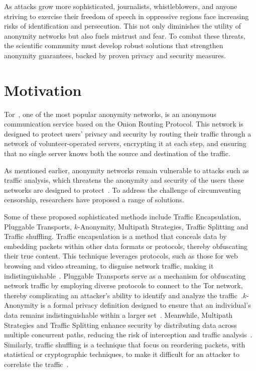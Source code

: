 As attacks grow more sophisticated, journalists, whistleblowers, and anyone striving to exercise their freedom of speech in oppressive regions face increasing risks of identification and persecution. This not only diminishes the utility of anonymity networks but also fuels mistrust and fear. To combat these threats, the scientific community must develop robust solutions that strengthen anonymity guarantees, backed by proven privacy and security measures.


\section{Motivation}\label{sec:motivation}

Tor~\cite{dingledine2004tor}, one of the most popular anonymity networks, is an anonymous communication service based on the Onion Routing Protocol. This network is designed to protect users' privacy and security by routing their traffic through a network of volunteer-operated servers, encrypting it at each step, and ensuring that no single server knows both the source and destination of the traffic.

As mentioned earlier, anonymity networks remain vulnerable to attacks such as traffic analysis, which threatens the anonymity and security of the users these networks are designed to protect~\cite*{chakravarty2014trafficanalysis, winter2012great, robjansen2019dosontor, StatDisclosure, PracticalStatDisclosure, DeepFingerprinting, TikTok, OnlineWebFingerprinting, TrafficAnalysisLowMixnet, AnalysisMixNetsYeZhu}. To address the challenge of circumventing censorship, researchers have proposed a range of solutions. 

Some of these proposed sophisticated methods include Traffic Encapsulation, Pluggable Transports, \(k\)-Anonymity, Multipath Strategies, Traffic Splitting and Traffic shuffling. Traffic encapsulation is a method that conceals data by embedding packets within other data formats or protocols, thereby obfuscating their true content. This technique leverages protocols, such as those for web browsing and video streaming, to disguise network traffic, making it indistinguishable~\cite*{TorKameleon, MIRACE, StegoTorus, Protozoa, Stegozoa, Freewave}. Pluggable Transports serve as a mechanism for obfuscating network traffic by employing diverse protocols to connect to the Tor network, thereby complicating an attacker's ability to identify and analyze the traffic~\cite*{PlugTrans,Circumvention,TorKameleon}.\@\(k\)-Anonymity is a formal privacy definition designed to ensure that an individual's data remains indistinguishable within a larger set~\cite*{DP_Book,KAnonSweeney,kAnonymityEffectiveness}. Meanwhile, Multipath Strategies and Traffic Splitting enhance security by distributing data across multiple concurrent paths, reducing the risk of interception and traffic analysis~\cite*{TorKameleon,MIRACE,Loopix,Wang_2022}. Similarly, traffic shuffling is a technique that focus on reordering packets, with statistical or cryptographic techniques, to make it difficult for an attacker to correlate the traffic~\cite*{DAENet, Karaoke, Riposte, Loopix, Dissent}. 

